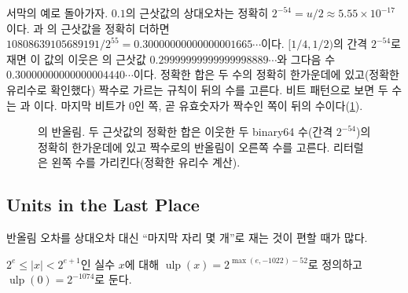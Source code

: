 서막의 예로 돌아가자. $0.1$의 근삿값의 상대오차는 정확히 $2^{-54}=u/2\approx5.55\times10^{-17}$이다. 과 의 근삿값을 정확히 더하면 $10808639105689191/2^{55}=0.30000000000000001665\cdots$이다. $[1/4,1/2)$의 간격 $2^{-54}$로 재면 이 값의 이웃은 의 근삿값 $0.29999999999999998889\cdots$와 그다음 수 $0.30000000000000004440\cdots$이다. 정확한 합은 두 수의 정확히 한가운데에 있고(정확한 유리수로 확인했다) 짝수로 가르는 규칙이 뒤의 수를 고른다. 비트 패턴으로 보면 두 수는 과 이다. 마지막 비트가 $0$인 쪽, 곧 유효숫자가 짝수인 쪽이 뒤의 수이다(\cref{fig:point-three}).

\begin{figure}[htbp]
\centering
{}
\caption{의 반올림. 두 근삿값의 정확한 합은 이웃한 두 binary64 수(간격 $2^{-54}$)의 정확히 한가운데에 있고 짝수로의 반올림이 오른쪽 수를 고른다. 리터럴 은 왼쪽 수를 가리킨다(정확한 유리수 계산).}
\label{fig:point-three}
\end{figure}


\subsection{Units in the Last Place}

반올림 오차를 상대오차 대신 ``마지막 자리 몇 개''로 재는 것이 편할 때가 많다.

\begin{definition}[ULP]
\label{def:ulp}
$2^e\le|x|<2^{e+1}$인 실수 $x$에 대해 $\operatorname{ulp}(x)=2^{\max(e,-1022)-52}$로 정의하고 $\operatorname{ulp}(0)=2^{-1074}$로 둔다.
\end{definition}

